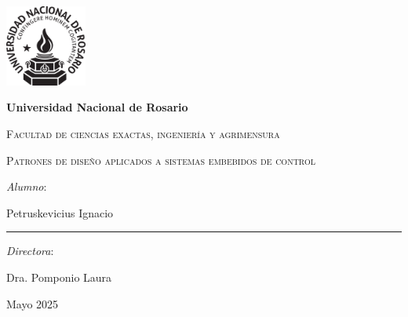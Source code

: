 \documentclass[twoside]{mitthesis}%
\begin{document}
\begin{titlepage}
\begin{center}

{\includegraphics[width=0.2\textwidth]{logo-unr.png}\par}
\vspace{1cm}
{\bfseries\LARGE Universidad Nacional de Rosario \par}
\vspace{1cm}
{\scshape\Large Facultad de ciencias exactas, ingeniería y agrimensura \par}
\vspace{2cm}
\vspace{1cm}
{\scshape\Huge Patrones de diseño aplicados a sistemas embebidos de control\par}
\vfill
\end{center}
{\textit{Alumno}: \par}
{\Large Petruskevicius Ignacio\par}
\rule{5.62cm}{0.3mm}
\vspace{2mm}

\noindent
{\textit{Directora}: \par}
\noindent
{\Large Dra. Pomponio Laura\par}
\vspace{1cm}
\begin{center}
{Mayo 2025 \par}
\end{center}
\end{titlepage}


%
%
%


%
%
%
%
%
%
%
%
%
\end{document}
